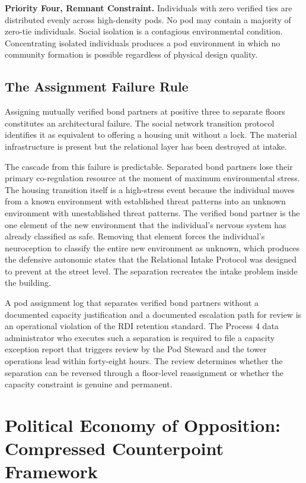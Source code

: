 \documentclass[12pt, letterpaper]{article}
\begin{document}
\textbf{Priority Four, Remnant Constraint.} Individuals with zero verified ties are distributed evenly across high-density pods. No pod may contain a majority of zero-tie individuals. Social isolation is a contagious environmental condition. Concentrating isolated individuals produces a pod environment in which no community formation is possible regardless of physical design quality.

\subsection{The Assignment Failure Rule}

Assigning mutually verified bond partners at positive three to separate floors constitutes an architectural failure. The social network transition protocol identifies it as equivalent to offering a housing unit without a lock. The material infrastructure is present but the relational layer has been destroyed at intake.

The cascade from this failure is predictable. Separated bond partners lose their primary co-regulation resource at the moment of maximum environmental stress. The housing transition itself is a high-stress event because the individual moves from a known environment with established threat patterns into an unknown environment with unestablished threat patterns. The verified bond partner is the one element of the new environment that the individual's nervous system has already classified as safe. Removing that element forces the individual's neuroception to classify the entire new environment as unknown, which produces the defensive autonomic states that the Relational Intake Protocol was designed to prevent at the street level. The separation recreates the intake problem inside the building.

A pod assignment log that separates verified bond partners without a documented capacity justification and a documented escalation path for review is an operational violation of the RDI retention standard. The Process 4 data administrator who executes such a separation is required to file a capacity exception report that triggers review by the Pod Steward and the tower operations lead within forty-eight hours. The review determines whether the separation can be reversed through a floor-level reassignment or whether the capacity constraint is genuine and permanent.


\clearpage
\section{Political Economy of Opposition: Compressed Counterpoint Framework}
\end{document}
